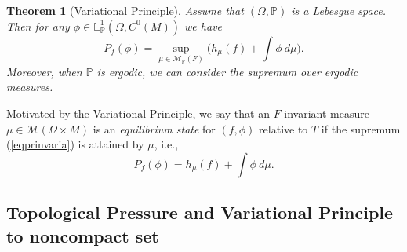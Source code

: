 \documentclass[12pt,a4paper]{amsart}
\theoremstyle{plain}
\newtheorem{theorem}{Theorem}
\begin{document}
	\begin{theorem}	[Variational Principle]\label{thprinvaria}
		Assume that $(\Omega, \mathbb{P})$ is a Lebesgue space. Then for any $\phi\in \mathbb{L}^{1}_{\mathbb{P}}(\Omega,C^0(M))$ we have
		\begin{equation} 	\label{eqprinvaria}
			P_{f}(\phi)=\sup_{\mu\in \mathcal{M}_{\mathbb{P}}(F)}\biggl(h_{\mu}(f)+\int\phi\ d\mu \biggr).
		\end{equation}
		Moreover, when $\mathbb{P}$ is ergodic, we can consider the supremum over ergodic measures. 
	\end{theorem}
	
	Motivated by the Variational Principle, we say that an $F$-invariant measure $\mu\in \mathcal{M}(\Omega\times M)$ is an \emph{equilibrium state} for $(f, \phi)$ relative to $T$ if the supremum (\ref{eqprinvaria}) is attained by $\mu$, i.e.,
	\[
	P_{f}(\phi)=h_{\mu}(f)+\int\phi \ d\mu.
	\]
	
	
	\subsection{Topological Pressure and Variational Principle to noncompact set}
	
\end{document}
